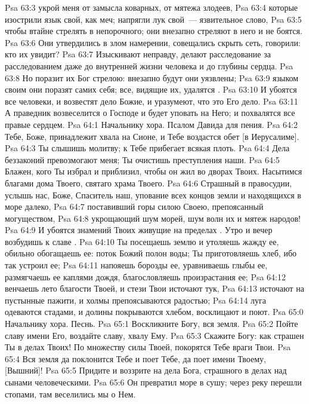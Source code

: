 \vs Psa 63:3 укрой меня от замысла коварных, от мятежа злодеев,
\vs Psa 63:4 которые изострили язык свой, как меч; напрягли лук свой~--- язвительное слово,
\vs Psa 63:5 чтобы втайне стрелять в непорочного; они внезапно стреляют в него и не боятся.
\vs Psa 63:6 Они утвердились в злом намерении, совещались скрыть сеть, говорили: кто их увидит?
\vs Psa 63:7 Изыскивают неправду, делают расследование за расследованием даже до внутренней жизни человека и до глубины сердца.
\vs Psa 63:8 Но поразит их Бог стрелою: внезапно будут они уязвлены;
\vs Psa 63:9 языком своим они поразят самих себя; все, видящие их, удалятся .
\vs Psa 63:10 И убоятся все человеки, и возвестят дело Божие, и уразумеют, что это Его дело.
\vs Psa 63:11 А праведник возвеселится о Господе и будет уповать на Него; и похвалятся все правые сердцем.
\vs Psa 64:1 Начальнику хора. Псалом Давида для пения.
\rsbpar\vs Psa 64:2 Тебе, Боже, принадлежит хвала на Сионе, и Тебе воздастся обет [в Иерусалиме].
\vs Psa 64:3 Ты слышишь молитву; к Тебе прибегает всякая плоть.
\vs Psa 64:4 Дела беззаконий превозмогают меня; Ты очистишь преступления наши.
\vs Psa 64:5 Блажен, кого Ты избрал и приблизил, чтобы он жил во дворах Твоих. Насытимся благами дома Твоего, святаго храма Твоего.
\vs Psa 64:6 Страшный в правосудии, услышь нас, Боже, Спаситель наш, упование всех концов земли и находящихся в море далеко,
\vs Psa 64:7 поставивший горы силою Своею, препоясанный могуществом,
\vs Psa 64:8 укрощающий шум морей, шум волн их и мятеж народов!
\vs Psa 64:9 И убоятся знамений Твоих живущие на пределах . Утро и вечер возбудишь к славе .
\vs Psa 64:10 Ты посещаешь землю и утоляешь жажду ее, обильно обогащаешь ее: поток Божий полон воды; Ты приготовляешь хлеб, ибо так устроил ее;
\vs Psa 64:11 напояешь борозды ее, уравниваешь глыбы ее, размягчаешь ее каплями дождя, благословляешь произрастания ее;
\vs Psa 64:12 венчаешь лето благости Твоей, и стези Твои источают тук,
\vs Psa 64:13 источают на пустынные пажити, и холмы препоясываются радостью;
\vs Psa 64:14 луга одеваются стадами, и долины покрываются хлебом, восклицают и поют.
\vs Psa 65:0 Начальнику хора. Песнь.
\rsbpar\vs Psa 65:1 Воскликните Богу, вся земля.
\vs Psa 65:2 Пойте славу имени Его, воздайте славу, хвалу Ему.
\vs Psa 65:3 Скажите Богу: как страшен Ты в делах Твоих! По множеству силы Твоей, покорятся Тебе враги Твои.
\vs Psa 65:4 Вся земля да поклонится Тебе и поет Тебе, да поет имени Твоему, [Вышний]!
\vs Psa 65:5 Придите и воззрите на дела Бога, страшного в делах над сынами человеческими.
\vs Psa 65:6 Он превратил море в сушу; через реку перешли стопами, там веселились мы о Нем.
